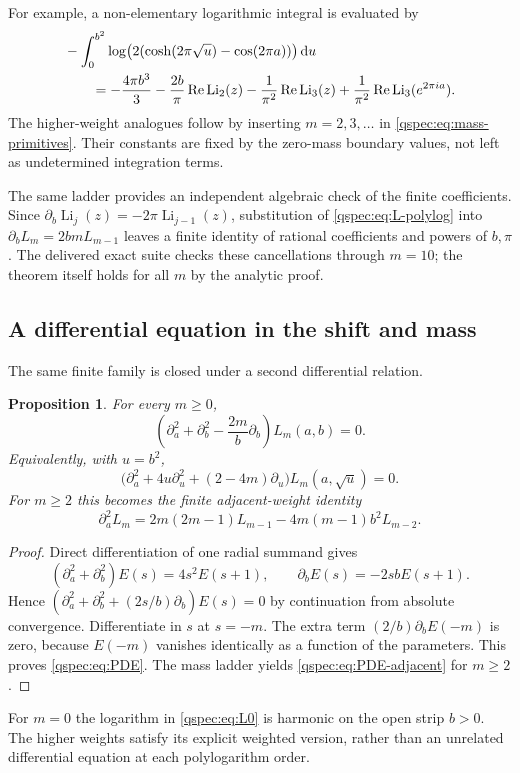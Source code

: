 \documentclass[11pt,letterpaper]{article}
\numberwithin{equation}{section}
\newtheorem{proposition}[theorem]{Proposition}
\theoremstyle{definition}
\newcommand{\Li}{\operatorname{Li}}
\newcommand{\Rea}{\operatorname{Re}}
\newcommand{\dd}{\,\mathrm{d}}
\begin{document}
For example, a non-elementary logarithmic integral is evaluated by
\begin{align}
&-\int_0^{b^2}\log\bigl(2(\cosh(2\pi\sqrt u)-\cos(2\pi a))\bigr)\dd u\notag\\
&\qquad=-\frac{4\pi b^3}{3}-\frac{2b}{\pi}\Rea\Li_2(z)
-\frac1{\pi^2}\Rea\Li_3(z)
+\frac1{\pi^2}\Rea\Li_3(e^{2\pi ia}).
\label{qspec:eq:log-mass-integral}
\end{align}
The higher-weight analogues follow by inserting $m=2,3,\ldots$ in
\eqref{qspec:eq:mass-primitives}. Their constants are fixed by the
zero-mass boundary values, not left as undetermined integration terms.

The same ladder provides an independent algebraic check of the finite
coefficients. Since $\partial_b\Li_j(z)=-2\pi\Li_{j-1}(z)$,
substitution of \eqref{qspec:eq:L-polylog} into
$\partial_bL_m=2bmL_{m-1}$ leaves a finite identity of rational
coefficients and powers of $b,\pi$. The delivered exact suite checks
these cancellations through $m=10$; the theorem itself holds for all
$m$ by the analytic proof.

\subsection{A differential equation in the shift and mass}
The same finite family is closed under a second differential relation.
\begin{proposition}\label{qspec:prop:PDE}
For every $m\ge0$,
\begin{equation}\label{qspec:eq:PDE}
\left(\partial_a^2+\partial_b^2-\frac{2m}{b}\partial_b\right)L_m(a,b)=0.
\end{equation}
Equivalently, with $u=b^2$,
\[
\bigl(\partial_a^2+4u\partial_u^2+(2-4m)\partial_u\bigr)
L_m(a,\sqrt u)=0.
\]
For $m\ge2$ this becomes the finite adjacent-weight identity
\begin{equation}\label{qspec:eq:PDE-adjacent}
\partial_a^2L_m=2m(2m-1)L_{m-1}-4m(m-1)b^2L_{m-2}.
\end{equation}
\end{proposition}
\begin{proof}
Direct differentiation of one radial summand gives
\[
(\partial_a^2+\partial_b^2)E(s)=4s^2E(s+1),
\qquad \partial_bE(s)=-2sbE(s+1).
\]
Hence $(\partial_a^2+\partial_b^2+(2s/b)\partial_b)E(s)=0$
by continuation from absolute convergence. Differentiate in $s$ at
$s=-m$. The extra term $(2/b)\partial_bE(-m)$ is zero, because
$E(-m)$ vanishes identically as a function of the parameters. This
proves \eqref{qspec:eq:PDE}. The mass ladder yields
\eqref{qspec:eq:PDE-adjacent} for $m\ge2$.
\end{proof}
For $m=0$ the logarithm in \eqref{qspec:eq:L0} is harmonic on the open
strip $b>0$. The higher weights satisfy its explicit weighted version,
rather than an unrelated differential equation at each polylogarithm order.
\end{document}
